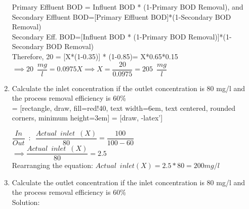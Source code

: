 \begin{enumerate}
Primary Effluent BOD = Influent BOD * (1-Primary BOD Removal), and\\
Secondary Effluent BOD=[Primary Effluent BOD]*(1-Secondary BOD Removal)\\
Secondary Eff. BOD=[Influent BOD * (1-Primary BOD Removal)]*(1-Secondary BOD Removal)\\

Therefore, 20 = [X*(1-0.35)] * (1-0.85)= X*0.65*0.15\\
$\implies 20 \enspace \dfrac{mg}{l}= 0.0975X \implies X=\dfrac{20}{0.0975}=\boxed{205 \enspace \dfrac{mg}{l}}$\\

\item Calculate the inlet concentration if the outlet concentration is 80 mg/l and the process removal efficiency is 60\%\\

 = [rectangle, draw, fill=red!40, 
    text width=6em, text centered, rounded corners, minimum height=3em]
 = [draw, -latex']
\begin{figure}[!h]
\centering
{}
\end{figure}

$\dfrac{In}{Out} \enspace : \enspace \dfrac{Actual \enspace inlet \enspace  (X)}{80}=\dfrac{100}{100-60}$\\
$\implies \dfrac{Actual \enspace inlet \enspace  (X)}{80}=2.5$\\    
Rearranging the equation:   $Actual \enspace inlet (X)=2.5*80 = \boxed{200 mg/l}$\\

\item Calculate the outlet concentration if the inlet concentration is 80 mg/l and the process removal efficiency is 60\%\\
Solution:\\


\end{enumerate}
